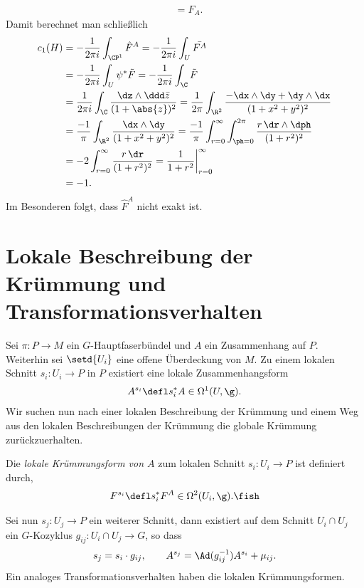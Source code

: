 \documentclass[%
	paper=a5,%
	fleqn,%
	DIV=18,%
	BCOR=0mm,
	fontsize=11pt,
	titlepage=false,%
	bibliography=totoc,
	DIV=18,%
	twoside=true,
	pdftitle=Riemannsche Geometrie,
	pdfauthor=Uwe Semmelmann,
	numbers=noendperiod]%
	{scrbook}
\begin{document}
\begin{ex}
\begin{align*}
&= F_A.
\end{align*}
Damit berechnet man schließlich
\begin{align*}
c_1(H) &= -\frac{1}{2\pi i} \int_{\CP^1} \hat{F}^A
 = -\frac{1}{2\pi i} \int_{U} \bar{F^A}\\
  &= -\frac{1}{2\pi i} \int_{U} \psi^* \tilde{F}
  = -\frac{1}{2\pi i} \int_{\C} \tilde{F}\\
  &= \frac{1}{2\pi i} \int_{\C} \frac{\dz\wedge \ddd\bar{z}}{(1+\abs{z})^2}
  = \frac{1}{2\pi} \int_{\R^2} \frac{-\dx\wedge \dy + \dy\wedge \dx 
  }{(1+x^2+y^2)^2}\\
  &= \frac{-1}{\pi} \int_{\R^2} \frac{\dx\wedge \dy  
  }{(1+x^2+y^2)^2} = 
  \frac{-1}{\pi} \int_{r=0}^\infty \int_{\ph=0}^{2\pi} \frac{r\,\dr\wedge\dph  
  }{(1+r^2)^2}\\
  &= -2 \int_{r=0}^\infty \frac{r\,\dr  
  }{(1+r^2)^2} =
  \frac{1}{1+r^2} \bigg|_{r=0}^\infty \\ 
  &= - 1.
\end{align*} 
Im Besonderen folgt, dass $\hat{F}^A$ nicht exakt ist.\boxc
\end{ex}


\section{Lokale Beschreibung der Krümmung und Transformationsverhalten}

Sei $\pi: P\to M$ ein $G$-Hauptfaserbündel und $A$ ein Zusammenhang auf $P$.
Weiterhin sei $\setd{U_i}$ eine offene Überdeckung von $M$. Zu einem lokalen
Schnitt $s_i : U_i\to P$ in $P$ existiert eine lokale Zusammenhangsform
\begin{align*}
A^{s_i} \defl s_i^* A \in\Omega^1(U,\g).
\end{align*}
Wir suchen nun nach einer lokalen Beschreibung der Krümmung und einem Weg aus
den lokalen Beschreibungen der Krümmung die globale Krümmung zurückzuerhalten.

\begin{defn}
Die \emph{lokale Krümmungsform von $A$} zum lokalen Schnitt $s_i :U_i\to P$ ist
definiert durch,
\begin{align*}
F^{s_i} \defl s_i^* F^A \in \Omega^2(U_i,\g).\fish
\end{align*}
\end{defn}

Sei nun $s_j :U_j\to P$ ein weiterer Schnitt, dann existiert auf dem Schnitt $U_i\cap U_j$ ein $G$-Kozyklus
$g_{ij}: U_i\cap U_j\to G$, so dass
\begin{align*}
s_j = s_i\cdot g_{ij},\qquad A^{s_j} = \Ad(g_{ij}^{-1})A^{s_i} + \mu_{ij}.
\end{align*}
Ein analoges Transformationsverhalten haben die lokalen Krümmungsformen.
\end{document}

